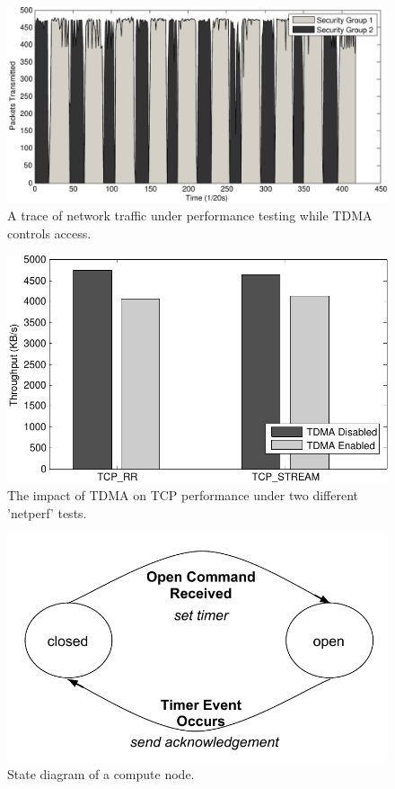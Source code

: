 \documentclass[oneside,12pt]{memoir}
\begin{document}
\begin{figure}
\centering
\includegraphics[scale=0.8]{Switching.pdf}
\caption{A trace of network traffic under performance testing while TDMA controls access.}
\label{fig:Switching}
\end{figure}

\begin{figure}
\centering
\includegraphics[scale=0.75]{detailed_performance.pdf}
\caption{The impact of TDMA on TCP performance under two different 'netperf' tests.}
\label{fig:detailed_performance}
\end{figure}

\begin{figure}
\centering
\includegraphics[scale=0.7]{node_state_diagram.pdf}
\caption{State diagram of a compute node.}
\label{fig:node_state_diagram}
\end{figure}
\end{document}
